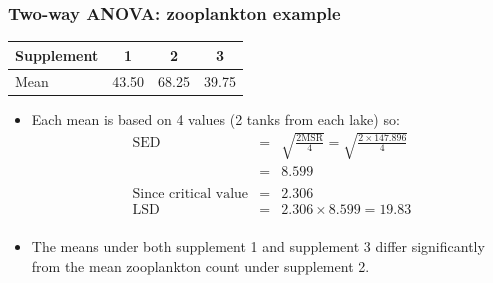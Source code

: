 \documentclass[12pt,xcolor=dvipsnames,handout,mathserif,aspectratio=169]{beamer}
\begin{document}
\begin{frame}
\frametitle{Two-way ANOVA: zooplankton example}
\begin{center}
\begin{tabular}{l|ccc} \hline
Supplement& 1& 2& 3\\ \hline
Mean&  43.50  & 68.25  &   39.75 \\ \hline
\end{tabular}
\end{center}
\begin{itemize}
\item Each mean is based on 4 values (2 tanks from each lake) so:
\begin{eqnarray*}
\mbox{SED} &=& \sqrt{\frac{2\mbox{MSR}}{4}} = \sqrt{\frac{2 \times147.896 }{4}}\\
&=& 8.599\\ \\
\mbox{Since}\,\, \mbox{critical value} &=& 2.306\\
\mbox{LSD} &=& 2.306 \times 8.599 = 19.83\\
\end{eqnarray*}
\item The means under both supplement 1 and supplement 3 differ significantly from the mean zooplankton count under supplement 2.
\end{itemize}
\end{frame}
\end{document}
